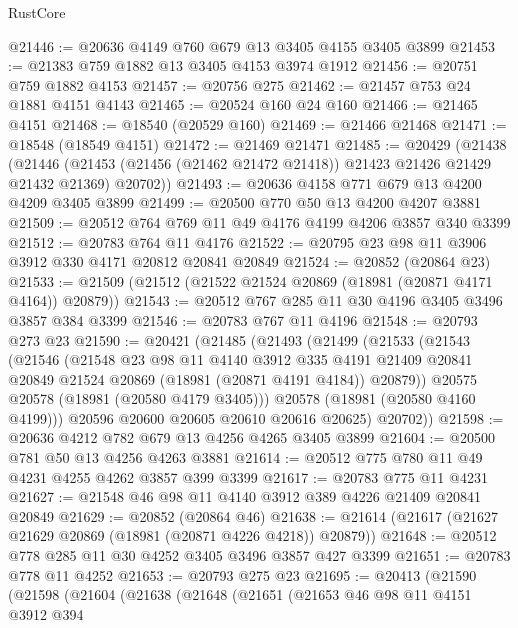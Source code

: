 \begin{lexlean}{RustCore}
\begin{coremodule}
@21446 := @20636 @4149 @760 @679 @13 @3405 @4155 @3405 @3899
@21453 := @21383 @759 @1882 @13 @3405 @4153 @3974 @1912
@21456 := @20751 @759 @1882 @4153
@21457 := @20756 @275
@21462 := @21457 @753 @24 @1881 @4151 @4143
@21465 := @20524 @160 @24 @160
@21466 := @21465 @4151
@21468 := @18540 (@20529 @160)
@21469 := @21466 @21468
@21471 := @18548 (@18549 @4151)
@21472 := @21469 @21471
@21485 := @20429
    (@21438
      (@21446 (@21453 (@21456 (@21462 @21472 @21418)) @21423 @21426 @21429 @21432 @21369) @20702))
@21493 := @20636 @4158 @771 @679 @13 @4200 @4209 @3405 @3899
@21499 := @20500 @770 @50 @13 @4200 @4207 @3881
@21509 := @20512 @764 @769 @11 @49 @4176 @4199 @4206 @3857 @340 @3399
@21512 := @20783 @764 @11 @4176
@21522 := @20795 @23 @98 @11 @3906 @3912 @330 @4171 @20812 @20841 @20849
@21524 := @20852 (@20864 @23)
@21533 := @21509 (@21512 (@21522 @21524 @20869 (@18981 (@20871 @4171 @4164)) @20879))
@21543 := @20512 @767 @285 @11 @30 @4196 @3405 @3496 @3857 @384 @3399
@21546 := @20783 @767 @11 @4196
@21548 := @20793 @273 @23
@21590 := @20421
    (@21485
      (@21493
        (@21499
          (@21533
            (@21543
              (@21546
                (@21548
                  @23
                  @98
                  @11
                  @4140
                  @3912
                  @335
                  @4191
                  @21409
                  @20841
                  @20849
                  @21524
                  @20869
                  (@18981 (@20871 @4191 @4184))
                  @20879))
              @20575
              @20578
              (@18981 (@20580 @4179 @3405)))
            @20578
            (@18981 (@20580 @4160 @4199)))
          @20596
          @20600
          @20605
          @20610
          @20616
          @20625)
        @20702))
@21598 := @20636 @4212 @782 @679 @13 @4256 @4265 @3405 @3899
@21604 := @20500 @781 @50 @13 @4256 @4263 @3881
@21614 := @20512 @775 @780 @11 @49 @4231 @4255 @4262 @3857 @399 @3399
@21617 := @20783 @775 @11 @4231
@21627 := @21548 @46 @98 @11 @4140 @3912 @389 @4226 @21409 @20841 @20849
@21629 := @20852 (@20864 @46)
@21638 := @21614 (@21617 (@21627 @21629 @20869 (@18981 (@20871 @4226 @4218)) @20879))
@21648 := @20512 @778 @285 @11 @30 @4252 @3405 @3496 @3857 @427 @3399
@21651 := @20783 @778 @11 @4252
@21653 := @20793 @275 @23
@21695 := @20413
    (@21590
      (@21598
        (@21604
          (@21638
            (@21648
              (@21651
                (@21653
                  @46
                  @98
                  @11
                  @4151
                  @3912
                  @394

\end{coremodule}
\end{lexlean}
